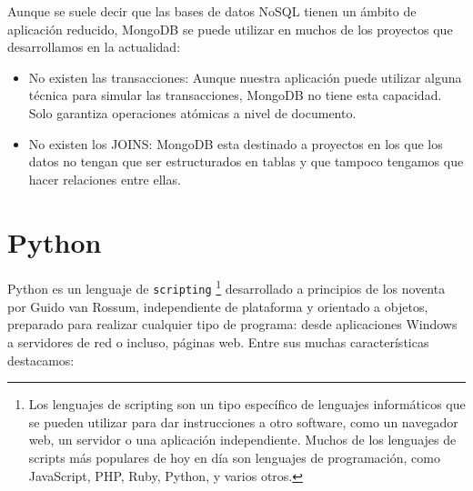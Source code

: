 \documentclass[a4paper, 12pt]{book}
\begin{document}
	Aunque se suele decir que las bases de datos NoSQL tienen un ámbito de aplicación reducido, MongoDB se puede utilizar en muchos de los proyectos que desarrollamos en la actualidad:
\begin{itemize}
	\item No existen las transacciones: Aunque nuestra aplicación puede utilizar alguna técnica para simular las transacciones, MongoDB no tiene esta capacidad. Solo garantiza operaciones atómicas a nivel de documento.
	\item No existen los JOINS: MongoDB esta destinado a proyectos en los que los datos no tengan que  ser estructurados en tablas y que tampoco tengamos que hacer relaciones entre ellas.
\end{itemize}

\section{Python} 
\label{sec:Python}
Python es un lenguaje de \texttt{scripting} 
\footnote{Los lenguajes de scripting son un tipo específico de lenguajes informáticos que se pueden utilizar para dar instrucciones a otro software, como un navegador web, un servidor o una aplicación independiente. Muchos de los lenguajes de scripts más populares de hoy en día son lenguajes de programación, como JavaScript, PHP, Ruby, Python, y varios otros.} desarrollado a principios de los noventa por Guido van Rossum, independiente de plataforma y orientado a objetos, preparado para realizar cualquier tipo de programa: desde aplicaciones Windows a servidores de red o incluso, páginas web. Entre sus muchas características destacamos:
\end{document}
